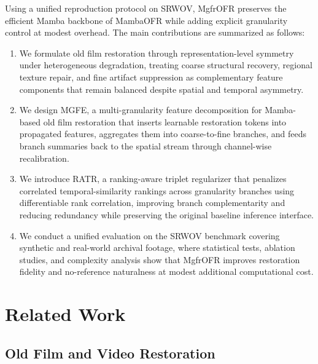 \documentclass[symmetry,article,submit,pdftex,moreauthors]{Definitions/mdpi}
\begin{document}
Using a unified reproduction protocol on SRWOV, MgfrOFR preserves the efficient Mamba backbone of MambaOFR while adding explicit granularity control at modest overhead. The main contributions are summarized as follows:
\begin{enumerate}
    \item We formulate old film restoration through representation-level symmetry under heterogeneous degradation, treating coarse structural recovery, regional texture repair, and fine artifact suppression as complementary feature components that remain balanced despite spatial and temporal asymmetry.
    \item We design MGFE, a multi-granularity feature decomposition for Mamba-based old film restoration that inserts learnable restoration tokens into propagated features, aggregates them into coarse-to-fine branches, and feeds branch summaries back to the spatial stream through channel-wise recalibration.
    \item We introduce RATR, a ranking-aware triplet regularizer that penalizes correlated temporal-similarity rankings across granularity branches using differentiable rank correlation, improving branch complementarity and reducing redundancy while preserving the original baseline inference interface.
    \item We conduct a unified evaluation on the SRWOV benchmark covering synthetic and real-world archival footage, where statistical tests, ablation studies, and complexity analysis show that MgfrOFR improves restoration fidelity and no-reference naturalness at modest additional computational cost.
\end{enumerate}
\section{Related Work}
\label{sec:related}

\subsection{Old Film and Video Restoration}
\label{subsec:ofr}
\end{document}
